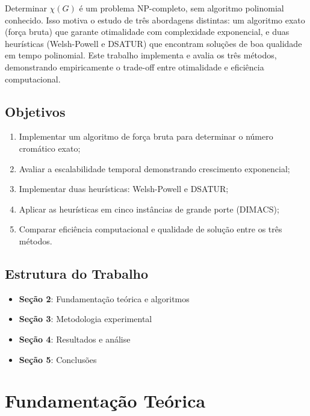 \documentclass[12pt]{article}
\begin{document}
Determinar $\chi(G)$ é um problema NP-completo, sem algoritmo polinomial conhecido. Isso motiva o estudo de três abordagens distintas: um algoritmo exato (força bruta) que garante otimalidade com complexidade exponencial, e duas heurísticas (Welsh-Powell e DSATUR) que encontram soluções de boa qualidade em tempo polinomial. Este trabalho implementa e avalia os três métodos, demonstrando empiricamente o trade-off entre otimalidade e eficiência computacional.

\subsection{Objetivos}

\begin{enumerate}
    \item Implementar um algoritmo de força bruta para determinar o número cromático exato;
    \item Avaliar a escalabilidade temporal demonstrando crescimento exponencial;
    \item Implementar duas heurísticas: Welsh-Powell e DSATUR;
    \item Aplicar as heurísticas em cinco instâncias de grande porte (DIMACS);
    \item Comparar eficiência computacional e qualidade de solução entre os três métodos.
\end{enumerate}

\subsection{Estrutura do Trabalho}

\begin{itemize}
    \item \textbf{Seção 2}: Fundamentação teórica e algoritmos
    \item \textbf{Seção 3}: Metodologia experimental
    \item \textbf{Seção 4}: Resultados e análise
    \item \textbf{Seção 5}: Conclusões
\end{itemize}

\newpage
\section{Fundamentação Teórica}
\end{document}

